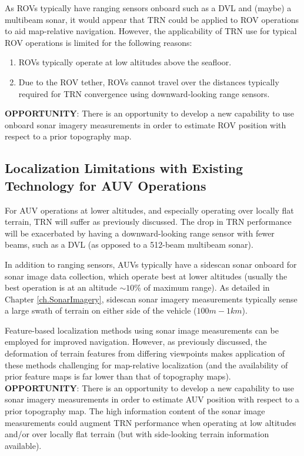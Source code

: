 As ROVs typically have ranging sensors onboard such as a DVL and (maybe) a multibeam sonar, it would appear that TRN could be applied to ROV operations to aid map-relative navigation.  However, the applicability of TRN use for typical ROV operations is limited for the following reasons:

 \begin{enumerate}  
 \item ROVs typically operate at low altitudes above the seafloor.
 \item Due to the ROV tether, ROVs cannot travel over the distances typically required for TRN convergence using downward-looking range sensors.
 \end{enumerate}
 
\noindent \textbf{OPPORTUNITY}: There is an opportunity to develop a new capability to use onboard sonar imagery measurements in order to estimate ROV position with respect to a prior topography map.

\subsection{Localization Limitations with Existing Technology for AUV Operations}
\label{intro.Autonomous.Limitations}

For AUV operations at lower altitudes, and especially operating over locally flat terrain, TRN will suffer as previously discussed. 
The drop in TRN performance will be exacerbated by having a downward-looking range sensor with fewer beams, such as a DVL (as opposed to a 512-beam multibeam sonar).

In addition to ranging sensors, AUVs typically have a sidescan sonar onboard for sonar image data collection, which operate best at lower altitudes (usually the best operation is at an altitude $\sim 10 \%$ of maximum range).
As detailed in Chapter \ref{ch.SonarImagery}, sidescan sonar imagery measurements typically sense a large swath of terrain on either side of the vehicle ($100m-1km$).

Feature-based localization methods using sonar image measurements can be employed for improved navigation.
However, as previously discussed, the deformation of terrain features from differing viewpoints makes application of these methods challenging for map-relative localization (and the availability of prior feature maps is far lower than that of topography maps).
\\ 

\noindent \textbf{OPPORTUNITY}: There is an opportunity to develop a new capability to use sonar imagery measurements in order to estimate AUV position with respect to a prior topography map.
The high information content of the sonar image measurements could augment TRN performance when operating at low altitudes and/or over locally flat terrain (but with side-looking terrain information available).


